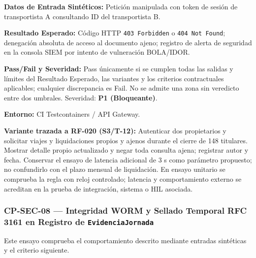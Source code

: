 \par\noindent\textbf{Datos de Entrada Sintéticos:} Petición manipulada con token de sesión de transportista A consultando ID del transportista B.\par
\par\noindent\textbf{Resultado Esperado:} Código HTTP \texttt{4\allowbreak{}0\allowbreak{}3\allowbreak{} F\allowbreak{}o\allowbreak{}r\allowbreak{}b\allowbreak{}i\allowbreak{}d\allowbreak{}d\allowbreak{}e\allowbreak{}n\allowbreak{}} o \texttt{4\allowbreak{}0\allowbreak{}4\allowbreak{} N\allowbreak{}o\allowbreak{}t\allowbreak{} F\allowbreak{}o\allowbreak{}u\allowbreak{}n\allowbreak{}d\allowbreak{}}; denegación absoluta de acceso al documento ajeno; registro de alerta de seguridad en la consola SIEM por intento de vulneración BOLA/IDOR.\par
\par\noindent\textbf{Pass/Fail y Severidad:} Pass únicamente si se cumplen todas las salidas y límites del Resultado Esperado, las variantes y los criterios contractuales aplicables; cualquier discrepancia es Fail. No se admite una zona sin veredicto entre dos umbrales. Severidad: \textbf{P1 (Bloqueante)}.\par
\par\noindent\textbf{Entorno:} CI Testcontainers / API Gateway.\par







\par\noindent\textbf{Variante trazada a RF-020 (S3/T-12):} Autenticar dos propietarios y solicitar viajes y liquidaciones propios y ajenos durante el cierre de 148 titulares. Mostrar detalle propio actualizado y negar toda consulta ajena; registrar autor y fecha. Conservar el ensayo de latencia adicional de 3 s como parámetro propuesto; no confundirlo con el plazo mensual de liquidación. En ensayo unitario se comprueba la regla con reloj controlado; latencia y comportamiento externo se acreditan en la prueba de integración, sistema o HIL asociada.\par
\subsubsection*{CP-SEC-08 — Integridad WORM y Sellado Temporal RFC 3161 en Registro de \texttt{E\allowbreak{}v\allowbreak{}i\allowbreak{}d\allowbreak{}e\allowbreak{}n\allowbreak{}c\allowbreak{}i\allowbreak{}a\allowbreak{}J\allowbreak{}o\allowbreak{}r\allowbreak{}n\allowbreak{}a\allowbreak{}d\allowbreak{}a\allowbreak{}}}\label{sec:9-cp-sec-08}
Este ensayo comprueba el comportamiento descrito mediante entradas sintéticas y el criterio siguiente.

